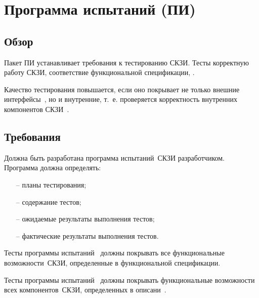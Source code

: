\section{Программа испытаний (ПИ)}\label{TE}

\subsection{Обзор}\label{TE.Intro}

Пакет ПИ устанавливает требования к тестированию СКЗИ.
%
Тесты  корректную работу СКЗИ, 
соответствие функциональной спецификации,
.

Качество тестирования повышается, если оно покрывает не только внешние 
интерфейсы~, но и внутренние, 
т.~е.  проверяется корректность внутренних компонентов 
СКЗИ~. 

\subsection{Требования}\label{TE.Reqs}

\label{R.TE.Prg}
Должна быть разработана программа испытаний~СКЗИ разработчиком.
Программа должна определять:
\begin{itemize}
\item[--]
планы тестирования;
\item[--]
содержание тестов;
\item[--]
ожидаемые результаты выполнения тестов;
\item[--]
фактические результаты выполнения тестов.
\end{itemize}

\label{R.TE.Coverage}
Тесты программы испытаний~ должны 
покрывать все функциональные возможности~СКЗИ, 
определенные в функциональной спецификации.

\label{R.TE.Deep}
Тесты программы испытаний~ должны 
покрывать функциональные возможности всех компонентов~СКЗИ, 
определенных в описани~.

